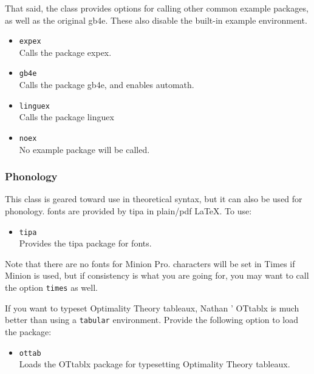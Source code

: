 \documentclass[11pt, tipa, color]{./lingdoc}
\newcommand{\Option}[1]{\texttt{#1}}
\newcommand{\Package}[1]{\textsf{{#1}}}
\newcommand{\ipa}{\Abbrev{ipa}\xspace}
\begin{document}
    That said, the class provides options for calling other common example packages, as well as the original \Package{gb4e}. These also disable the built-in example environment.
    
      \begin{itemize}[leftmargin=0em]
        \item \Option{expex} \\ Calls the package \Package{expex}.
        \item \Option{gb4e} \\ Calls the package \Package{gb4e}, and enables automath.
        \item \Option{linguex} \\ Calls the package \Package{linguex}
        \item \Option{noex} \\ No example package will be called.
      \end{itemize}

  \subsubsection{Phonology}
      
    This class is geared toward use in theoretical syntax, but it can also be used for phonology. \ipa fonts  are provided by \Package{tipa} in plain/pdf \LaTeX. To use:

      \begin{itemize}[leftmargin=0em]
        \item \Option{tipa} \\
          Provides the \Package{tipa} package for \ipa fonts.
      \end{itemize}

    \noindent Note that there are no \ipa fonts for Minion Pro. \ipa characters will be set in Times if Minion is used, but if consistency is what you are going for, you may want to call the option \Option{times} as well. 

    If you want to typeset Optimality Theory tableaux, Nathan \citeauthor{Sanders:2014}' \Package{OTtablx} is much better than using a \verb+tabular+ environment. Provide the following option to load the package:

      \begin{itemize}[leftmargin=0em]
        \item \Option{ottab} \\
          Loads the \Package{OTtablx} package for typesetting Optimality Theory tableaux.
      \end{itemize}
\end{document}
